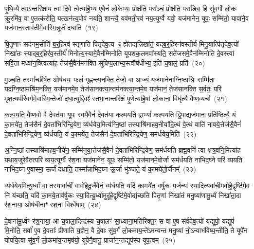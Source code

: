 {\anuvakamend[{जु॒षे॒ सते॑जस॒मन॑क्षसङ्गं बहुशा॒खं वृ॑श्चेदे॒ष वै य॒ज्ञ उपै॑न॒मुत्त॑रो य॒ज्ञ आप्त्या॒ एका॒न्नविꣳ॑श॒तिश्च॑}]}%

पृ॒थि॒व्यै त्वा॒ऽन्तरि॑क्षाय त्वा दि॒वे त्वेत्या॑है॒भ्य ए॒वैनं॑ लो॒केभ्यः॒ प्रोक्ष॑ति॒ परा᳚ञ्चं॒ प्रोक्ष॑ति॒ परा॑ङिव॒ हि सु॑व॒र्गो लो॒कः क्रू॒रमि॑व॒ वा ए॒तत्क॑रोति॒ यत्खन॑त्य॒पोव॑ नयति॒ शान्त्यै॒ यव॑मती॒रव॑ नय॒त्यूर्ग्वै यवो॒ यज॑मानेन॒ यूपः॒ सम्मि॑तो॒ यावा॑ने॒व यज॑मान॒स्ताव॑तीमे॒वास्मि॒न्नूर्जं॑ दधाति~(१९)

पि॒तृ॒णाꣳ सद॑नम॒सीति॑ ब॒र्॒\mbox{}हिरव॑ स्तृणाति पितृदेव॒त्य ꣴ॒ ह्ये॑तद्यन्निखा॑तं॒ यद्ब॒र्॒\mbox{}हिरन॑वस्तीर्य मिनु॒यात्पि॑तृदेव॒त्यो॑ निखा॑तः स्याद्ब॒र्॒\mbox{}हिर॑व॒स्तीर्य॑ मिनोत्य॒स्यामे॒वैन॑म्मिनोति यूपशक॒लमवा᳚स्यति॒ सते॑जसमे॒वैन॑म्मिनोति दे॒वस्त्वा॑ सवि॒ता मध्वा॑न॒क्त्वित्या॑ह॒ तेज॑सै॒वैन॑मनक्ति सुपिप्प॒लाभ्य॒स्त्वौष॑धीभ्य॒ इति॑ च॒षालं॒ प्रति॑~(२०)

मु॒ञ्च॒ति॒ तस्मा᳚च्छीर्\mbox{}ष॒त ओष॑धयः॒ फलं॑ गृह्णन्त्य॒नक्ति॒ तेजो॒ वा आज्यं॒ यज॑मानेनाग्नि॒ष्ठाश्रिः॒ सम्मि॑ता॒ यद॑ग्नि॒ष्ठा\-मश्रि॑म॒नक्ति॒ यज॑मानमे॒व तेज॑सानक्त्या॒न्तम॑नक्त्या॒न्तमे॒व यज॑मानं॒ तेज॑सानक्ति स॒र्वतः॒ परि॑ मृश॒त्यप॑रिवर्गमे॒वा\-स्मि॒न्तेजो॑ दधा॒त्युद्दिवꣴ॑ स्तभा॒नान्तरि॑क्षं पृ॒णेत्या॑है॒षां लो॒कानां॒ विधृ॑त्यै वैष्ण॒व्यर्चा~(२१)

क॒ल्प॒य॒ति॒ वै॒ष्ण॒वो वै दे॒वत॑या॒ यूपः॒ स्वयै॒वैनं॑ दे॒वत॑या कल्पयति॒ द्वा\-भ्यां᳚ कल्पयति द्वि॒पाद्यज॑मानः॒ प्रति॑ष्ठित्यै॒ यं का॒मये॑त॒ तेज॑सैनं दे॒वता॑भिरिन्द्रि॒येण॒ व्य॑र्धयेय॒मित्य॑ग्नि॒ष्ठां तस्याश्रि॑माहव॒नीया॑दि॒त्थं वे॒त्थं वाति॑ नावये॒त्तेज॑सै॒वैनं॑ दे॒वता॑भिरिन्द्रि॒येण॒ व्य॑र्धयति॒ यं का॒मये॑त॒ तेज॑सैनं दे॒वता॑भिरिन्द्रि॒येण॒ सम॑र्धयेय॒मिति॑~(२२)

अ॒ग्नि॒ष्ठां तस्याश्रि॑माहव॒नीये॑न॒ सम्मि॑नुया॒त्तेज॑सै॒वैनं॑ दे॒वता॑भिरिन्द्रि॒येण॒ सम॑र्धयति ब्रह्म॒वनिं॑ त्वा क्षत्र॒वनि॒मित्या॑ह यथाय॒जुरे॒वैतत्परि॑ व्यय॒त्यूर्ग्वै र॑श॒ना यज॑मानेन॒ यूपः॒ सम्मि॑तो॒ यज॑मानमे॒वोर्जा सम॑र्धयति नाभिद॒घ्ने परि॑ व्ययति नाभिद॒घ्न ए॒वास्मा॒ ऊर्जं॑ दधाति॒ तस्मा᳚न्नाभिद॒घ्न ऊ॒र्जा भु॑ञ्जते॒ यं का॒मये॑तो॒र्जैनम्᳚~(२३)

व्य॑र्धयेय॒मित्यू॒र्ध्वां वा॒ तस्यावा॑चीं॒ वावो॑हेदू॒र्जैवैनं॒ व्य॑र्धयति॒ यदि॑ का॒मये॑त॒ वर्\mbox{}षु॑कः प॒र्जन्यः॑ स्या॒दित्यवा॑ची॒मवो॑हे॒\-द्वृष्टि॑मे॒व नि य॑च्छति॒ यदि॑ का॒मये॒ताव॑र्\mbox{}षुकः स्या॒दित्यू॒र्ध्वामुदू॑हे॒द्वृष्टि॑मे॒वोद्य॑च्छति पितृ॒णां निखा॑तं मनु॒ष्या॑णामू॒र्ध्वं निखा॑ता॒दा र॑श॒नाया॒ ओष॑धीनाꣳ रश॒ना विश्वे॑षाम्~(२४)

दे॒वाना॑मू॒र्ध्वꣳ र॑श॒नाया॒ आ च॒षाला॒दिन्द्र॑स्य च॒षालꣳ॑ सा॒ध्याना॒मति॑रिक्त॒ꣳ॒ स वा ए॒ष स॑र्वदेव॒त्यो॑ यद्यूपो॒ यद्यूपं॑ मि॒नोति॒ सर्वा॑ ए॒व दे॒वताः᳚ प्रीणाति य॒ज्ञेन॒ वै दे॒वाः सु॑व॒र्गं लो॒कमा॑य॒न्ते॑\-ऽमन्यन्त मनु॒ष्या॑ नो॒\-ऽन्वाभ॑विष्य॒न्तीति॒ ते यूपे॑न योपयि॒त्वा सु॑व॒र्गं लो॒कमा॑य॒न्तमृष॑यो॒ यूपे॑नै॒वानु॒ प्राजा॑न॒न्तद्यूप॑स्य यूप॒त्वम्~(२५)

